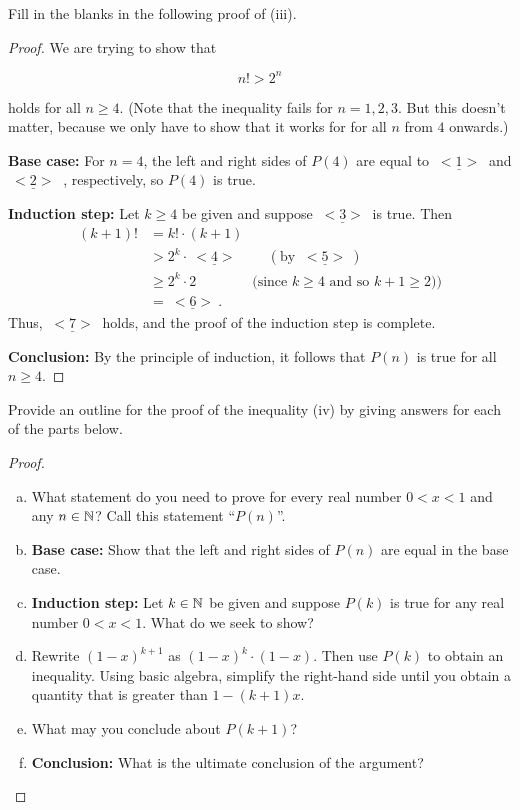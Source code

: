 \begin{exercise}
Fill in the blanks in the following proof of (iii).

\begin{proof}

We are trying to show that 
\smallskip

\[
n!>2^n
\tag{$P(n)$}
\]
\smallskip

holds for all $n\ge4$.
(Note that  the  inequality fails for $n=1,2,3$. But this doesn't matter, because we only have to show that it works for for all $n$ from $4$ onwards.) 


\noindent
\textbf{Base case:} For $n=4$, the left and right sides of $P(4)$ are equal to
$\underline{~<1>~}$   and $\underline{~<2>~}$ , respectively, so $P(4)$ is true. 

\noindent
\textbf{Induction step:} Let $k\ge4$ be given and suppose 
$\underline{~<3>~}$  is true. Then
\begin{align*}
(k+1)!&=k! \cdot (k+1)
\\
&>2^k \cdot \underline{~<4>~}
\qquad (\text{by } \underline{~<5>~} )
\\
&\ge 2^k\cdot 2
\qquad \qquad \text{(since $k\ge4$ and so $k+1\ge2$))}
\\
&=\underline{~<6>~}.
\end{align*}
Thus, $\underline{~<7>~}$  holds, and the proof of the induction step is complete. 

\noindent
\textbf{Conclusion:} By the principle of induction, 
it follows that  $P(n)$ is true for all $n\ge4$.  
\end{proof}

\end{exercise}

\begin{exercise}
Provide an outline for the proof of the inequality (iv) by giving answers for each of the parts below.

\begin{proof}
\begin{enumerate}[(a)]
\item
What statement do you need to prove for every  real number $0<x<1$  
and any $n\in\mathbb{N}$?  Call this statement ``$P(n)$''.
\item  \textbf{Base case:} Show that  the left and right sides of $P(n)$ are 
 equal in the base case.
\item
\textbf{Induction step:} Let $k\in\mathbb{N}$ be given and suppose $P(k)$ is true
for any real number $0<x<1$.   What do we seek to show?
\item
Rewrite $(1-x)^{k+1}$ as $(1-x)^k \cdot (1-x)$. Then use $P(k)$ to obtain an inequality. Using basic algebra, simplify the right-hand side until you obtain a quantity that is greater than $1-(k+1)x$.
\item
What may you conclude about $P(k+1)$?
\item
\textbf{Conclusion:} What is the ultimate conclusion of the argument?
\end{enumerate}
\end{proof}
\end{exercise}


